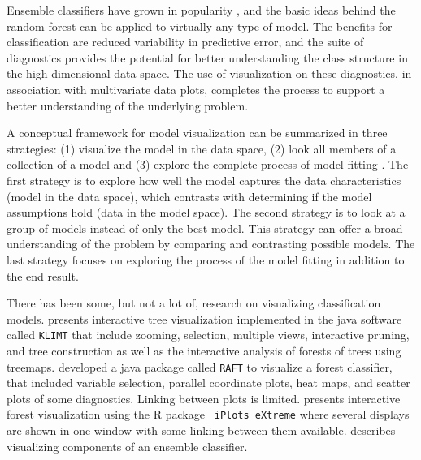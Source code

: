 \documentclass[10pt, legalpaper, twoside]{article}\usepackage[]{graphicx}\usepackage[]{color}
\begin{document}
Ensemble classifiers have grown in popularity \cite{dietterish00} \cite{talbot09}, and the basic ideas behind the random forest can be applied to virtually any type of model. The benefits for classification are reduced variability in predictive error, and the suite of diagnostics provides the potential for better understanding the class structure in the high-dimensional data space. The use of visualization on these diagnostics, in association with multivariate data plots, completes the process to support a better understanding of the underlying problem.

A conceptual framework for model visualization can be summarized in three strategies: (1) visualize the model in the data space, (2) look all members of a collection of a model and (3) explore the complete process of model fitting \cite{wickham2015visualizing}. The first strategy is to explore how well the model captures the data characteristics (model in the data space), which contrasts with determining if the model assumptions hold (data in the model space). The second strategy is to look at a group of models instead of only the best model. This strategy can offer a broad understanding of the problem by comparing and contrasting possible models. The last strategy focuses on exploring the process of the model fitting in addition to the end result.

There has been some, but not a lot of, research on visualizing classification models.
\cite{urbanek2002exploring} presents interactive tree visualization implemented in the java software called  \texttt{KLIMT} that include zooming, selection, multiple views, interactive pruning, and tree construction as well as the interactive analysis of forests of trees using treemaps. \cite{cutler15raft} developed a java package called \texttt{RAFT} to visualize a forest classifier, that included variable selection, parallel coordinate plots, heat maps, and scatter plots of some diagnostics. Linking between plots is limited. \cite{quach2012interactive} presents interactive forest visualization using the R package \texttt{ iPlots eXtreme}  \cite{urbanek2011iplots} where several displays are shown in one window with some linking between them available. \cite{Silva2016} describes visualizing components of an ensemble classifier.
\end{document}
